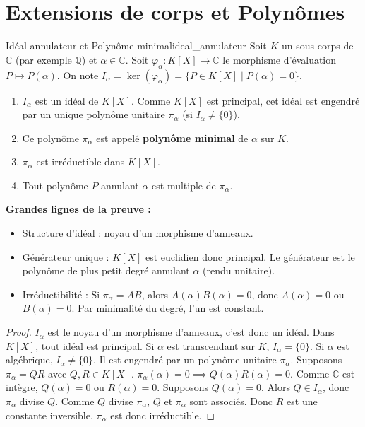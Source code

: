 \documentclass{prepacours}
\begin{document}
\section{Extensions de corps et Polynômes}

\begin{proposition}{Idéal annulateur et Polynôme minimal}{ideal_annulateur}
    Soit $K$ un sous-corps de $\mathbb{C}$ (par exemple $\mathbb{Q}$) et $\alpha \in \mathbb{C}$.
    Soit $\varphi_\alpha : K[X] \to \mathbb{C}$ le morphisme d'évaluation $P \mapsto P(\alpha)$.
    On note $I_\alpha = \ker(\varphi_\alpha) = \{P \in K[X] \mid P(\alpha) = 0\}$.
    \begin{enumerate}
        \item $I_\alpha$ est un idéal de $K[X]$. Comme $K[X]$ est principal, cet idéal est engendré par un unique polynôme unitaire $\pi_\alpha$ (si $I_\alpha \neq \{0\}$).
        \item Ce polynôme $\pi_\alpha$ est appelé \textbf{polynôme minimal} de $\alpha$ sur $K$.
        \item $\pi_\alpha$ est irréductible dans $K[X]$.
        \item Tout polynôme $P$ annulant $\alpha$ est multiple de $\pi_\alpha$.
    \end{enumerate}
\end{proposition}

\noindent \textbf{Grandes lignes de la preuve :}
\begin{itemize}
    \item Structure d'idéal : noyau d'un morphisme d'anneaux.
    \item Générateur unique : $K[X]$ est euclidien donc principal. Le générateur est le polynôme de plus petit degré annulant $\alpha$ (rendu unitaire).
    \item Irréductibilité : Si $\pi_\alpha = AB$, alors $A(\alpha)B(\alpha) = 0$, donc $A(\alpha)=0$ ou $B(\alpha)=0$. Par minimalité du degré, l'un est constant.
\end{itemize}

\begin{proof}
    $I_\alpha$ est le noyau d'un morphisme d'anneaux, c'est donc un idéal.
    Dans $K[X]$, tout idéal est principal. Si $\alpha$ est transcendant sur $K$, $I_\alpha = \{0\}$.
    Si $\alpha$ est algébrique, $I_\alpha \neq \{0\}$. Il est engendré par un polynôme unitaire $\pi_\alpha$.
    Supposons $\pi_\alpha = QR$ avec $Q, R \in K[X]$.
    $\pi_\alpha(\alpha) = 0 \implies Q(\alpha)R(\alpha) = 0$. Comme $\mathbb{C}$ est intègre, $Q(\alpha)=0$ ou $R(\alpha)=0$.
    Supposons $Q(\alpha)=0$. Alors $Q \in I_\alpha$, donc $\pi_\alpha$ divise $Q$.
    Comme $Q$ divise $\pi_\alpha$, $Q$ et $\pi_\alpha$ sont associés. Donc $R$ est une constante inversible.
    $\pi_\alpha$ est donc irréductible.
\end{proof}
\end{document}
